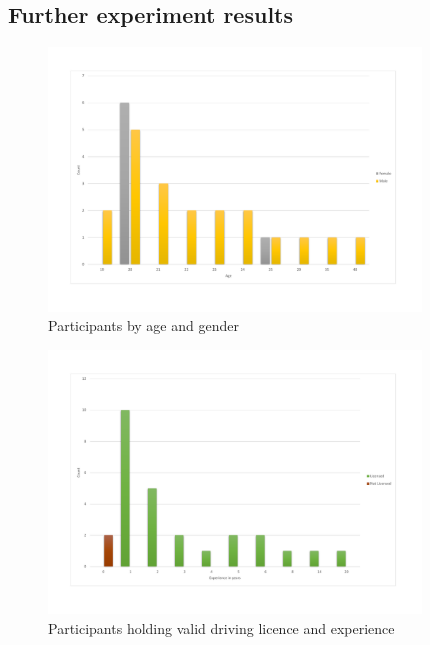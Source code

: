 \chapter{}

\section{Further experiment results}

\begin{figure}[!htb]
	\centering
	\includegraphics[height=7cm]{charts/genderAge.pdf}
	\caption[Participants by age and gender]{Participants by age and gender}
	\label{fig:chart-genderage}
\end{figure}

\begin{figure}[!htb]
	\centering
	\includegraphics[height=7cm]{charts/licenseddriversexperience.pdf}
	\caption[Participants holding valid driving licence]{Participants holding valid driving licence and experience}
	\label{fig:chart-licenseddriversexperience}
\end{figure}

